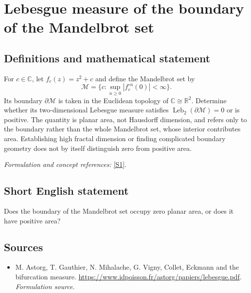 \documentclass[11pt]{article}
\begin{document}
\section*{\texorpdfstring{Lebesgue measure of the boundary of the Mandelbrot set}{Lebesgue measure of the boundary of the Mandelbrot set}}\label{30006920}
\subsection{Definitions and mathematical statement}
For $c\in{\mathbb{C}}$, let $f_c(z)=z^2+c$ and define the Mandelbrot set by
\[
 \mathcal M=\{c:\sup_{n\ge0}|f_c^{\circ n}(0)|<\infty\}.
\]
Its boundary $\partial\mathcal M$ is taken in the Euclidean topology of ${\mathbb{C}}\cong{\mathbb{R}}^2$. Determine whether its two-dimensional Lebesgue measure satisfies $\operatorname{Leb}_2(\partial\mathcal M)=0$ or is positive. The quantity is planar area, not Hausdorff dimension, and refers only to the boundary rather than the whole Mandelbrot set, whose interior contributes area. Establishing high fractal dimension or finding complicated boundary geometry does not by itself distinguish zero from positive area.
\par\smallskip\textit{Formulation and concept references:} \href{https://www.idpoisson.fr/astorg/papiers/lebesgue.pdf}{[S1]}.

\subsection{Short English statement}
Does the boundary of the Mandelbrot set occupy zero planar area, or does it have positive area?
\subsection{Sources}
\begin{itemize}
\item[S1]M. Astorg, T. Gauthier, N. Mihalache, G. Vigny, Collet, Eckmann and the bifurcation measure.
\url{https://www.idpoisson.fr/astorg/papiers/lebesgue.pdf}.
\textit{Formulation source.}
\end{itemize}
\end{document}
